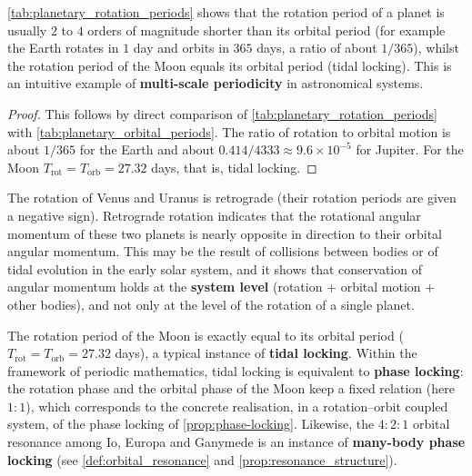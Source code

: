 \begin{proposition}\label{prop:astro_rotation_scales}
\cref{tab:planetary_rotation_periods} shows that the rotation period of a planet is usually $2$ to $4$ orders of magnitude shorter than its orbital period (for example the Earth rotates in $1$ day and orbits in $365$ days, a ratio of about $1/365$), whilst the rotation period of the Moon equals its orbital period (tidal locking). This is an intuitive example of \textbf{multi-scale periodicity} in astronomical systems.
\end{proposition}

\begin{proof}
This follows by direct comparison of \cref{tab:planetary_rotation_periods} with \cref{tab:planetary_orbital_periods}. The ratio of rotation to orbital motion is about $1/365$ for the Earth and about $0.414/4333\approx 9.6\times 10^{-5}$ for Jupiter. For the Moon $T_{\text{rot}}=T_{\text{orb}}=27.32$ days, that is, tidal locking.
\end{proof}

\begin{remark}\label{rem:astro_retrograde}
The rotation of Venus and Uranus is retrograde (their rotation periods are given a negative sign). Retrograde rotation indicates that the rotational angular momentum of these two planets is nearly opposite in direction to their orbital angular momentum. This may be the result of collisions between bodies or of tidal evolution in the early solar system, and it shows that conservation of angular momentum holds at the \textbf{system level} (rotation + orbital motion + other bodies), and not only at the level of the rotation of a single planet.
\end{remark}

\begin{remark}\label{rem:astro_tidal_lock}
The rotation period of the Moon is exactly equal to its orbital period ($T_{\text{rot}}=T_{\text{orb}}=27.32$ days), a typical instance of \textbf{tidal locking}. Within the framework of periodic mathematics, tidal locking is equivalent to \textbf{phase locking}: the rotation phase and the orbital phase of the Moon keep a fixed relation (here $1:1$), which corresponds to the concrete realisation, in a rotation--orbit coupled system, of the phase locking of \cref{prop:phase-locking}. Likewise, the $4:2:1$ orbital resonance among Io, Europa and Ganymede is an instance of \textbf{many-body phase locking} (see \cref{def:orbital_resonance} and \cref{prop:resonance_structure}).
\end{remark}

